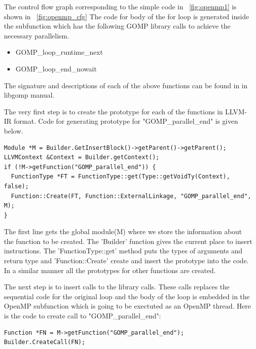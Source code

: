 The control flow graph corresponding to the simple code in ~\ref{fig:openmp1} is shown in ~\ref{fig:openmp_cfg}
The code for body of the for loop is generated inside the subfunction which has the following GOMP library
calls to achieve the necessary parallelism.

\begin{itemize}
\item GOMP\_loop\_runtime\_next
\item GOMP\_loop\_end\_nowait
\end{itemize}

The signature and descriptions of each of the above functions can be found in in libgomp manual\cite{libgomp}.

The very first step is to create the prototype for each of the functions in LLVM-IR format\cite{kaleid}.
Code for generating prototype for "GOMP\_parallel\_end" is given below.
{\footnotesize
\begin{lstlisting}
Module *M = Builder.GetInsertBlock()->getParent()->getParent();
LLVMContext &Context = Builder.getContext();
if (!M->getFunction("GOMP_parallel_end")) {
  FunctionType *FT = FunctionType::get(Type::getVoidTy(Context), false);
  Function::Create(FT, Function::ExternalLinkage, "GOMP_parallel_end", M);
}
\end{lstlisting}
}
The first line gets the global module(M) where we store the information about the function to be created.
The 'Builder' function gives the current place to insert instructions. The 'FunctionType::get' method
puts the types of arguments and return type and 'Function::Create' create and insert the prototype
into the code. In a similar manner all the prototypes for other functions are created.

The next step is to insert calls to the library calls. These calls replaces the sequential code for
the original loop and the body of the loop is embedded in the OpenMP subfunction which is
going to be exectuted as an OpenMP thread. Here is the code to create call to "GOMP\_parallel\_end":
{\footnotesize
\begin{lstlisting}
Function *FN = M->getFunction("GOMP_parallel_end");
Builder.CreateCall(FN);
\end{lstlisting}
}

